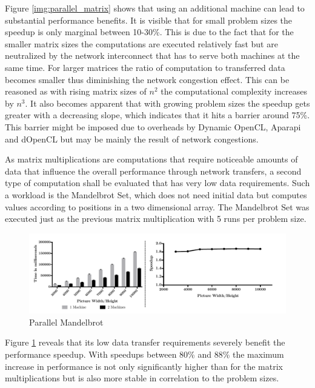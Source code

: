 Figure \ref{img:parallel_matrix} shows that using an additional machine can lead to substantial performance benefits. It is visible that for small problem sizes the speedup is only marginal between 10-30\%. This is due to the fact that for the smaller matrix sizes the computations are executed relatively fast but are neutralized by the network interconnect that has to serve both machines at the same time. For larger matrices the ratio of computation to transferred data becomes smaller thus diminishing the network congestion effect. This can be reasoned as with rising matrix sizes of $n^2$ the computational complexity increases by $n^3$. It also becomes apparent that with growing problem sizes the speedup gets greater with a decreasing slope, which indicates that it hits a barrier around 75\%. This barrier might be imposed due to overheads by Dynamic OpenCL, Aparapi and dOpenCL but may be mainly the result of network congestions.

As matrix multiplications are computations that require noticeable amounts of data that influence the overall performance through network transfers, a second type of computation shall be evaluated that has very low data requirements. Such a workload is the Mandelbrot Set, which does not need initial data but computes values according to positions in a two dimensional array. The Mandelbrot Set was executed just as the previous matrix multiplication with 5 runs per problem size.

\begin{figure}[H]
	
	\includegraphics[width=1.0\textwidth]{images/sharded_mandelbrot.pdf}
	\centering
	\caption{Parallel Mandelbrot}
	\label{img:parallel_mandelbrot}
\end{figure}

Figure \ref{img:parallel_mandelbrot} reveals that its low data transfer requirements severely benefit the performance speedup. With speedups between 80\% and 88\% the maximum increase in performance is not only significantly higher than for the matrix multiplications but is also more stable in correlation to the problem sizes.


